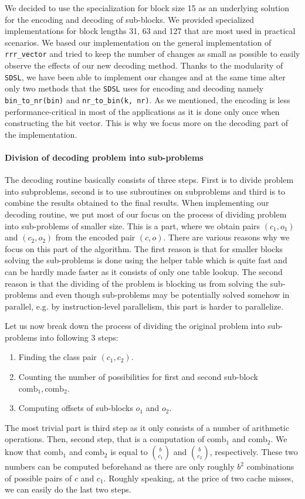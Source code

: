 We decided to use the specialization for block size 15 as an underlying solution for the encoding and
decoding of sub-blocks. We provided specialized implementations for block lengths 31, 63 and 127 that
are most used in practical scenarios. We based our implementation on the general implementation of
\verb'rrr_vector' and tried to keep the number of changes as small as possible to easily observe the
effects of our new decoding method. Thanks to the modularity of \texttt{SDSL}, we have been able to
implement our changes and at the same time alter only two methods that the \texttt{SDSL} uses for
encoding and decoding namely \verb'bin_to_nr(bin)' and \verb'nr_to_bin(k, nr)'. As we mentioned,
the encoding is less performance-critical in most of the applications as it is done only once when
constructing the bit vector. This is why we focus more on the decoding part of the implementation.

\paragraph{Division of decoding problem into sub-problems}

The decoding routine basically consists of three steps. First is to divide problem into subproblems,
second is to use subroutines on subproblems and third is to combine the results obtained to the final
results. When implementing our decoding routine, we put most of our focus on the process of dividing
problem into sub-problems of smaller size. This is a part, where we obtain pairs $(c_1, o_1)$ and $(c_2, o_2)$
from the encoded pair $(c, o)$. There are various reasons why we focus on this part of the algorithm.
The first reason is that for smaller blocks solving the sub-problems is done using the helper table
which is quite fast and can be hardly made faster as it consists of only one table lookup. The second
reason is that the dividing of the problem is blocking us from solving the sub-problems and even though
sub-problems may be potentially solved somehow in parallel, e.g. by instruction-level parallelism, this
part is harder to parallelize.

Let us now break down the process of dividing the original problem into sub-problems into following 3 steps:
\begin{enumerate}
	\item Finding the class pair $(c_1, c_2)$.
	\item Counting the number of possibilities for first and second sub-block $\text{comb}_1, \text{comb}_2$.
	\item Computing offsets of sub-blocks $o_1$ and $o_2$.
\end{enumerate}
The most trivial part is third step as it only consists of a number of arithmetic operations. Then,
second step, that is a computation of $\text{comb}_1$ and $\text{comb}_2$. We know that $\text{comb}_1$
and $\text{comb}_2$ is equal to ${b\choose c_1}$ and ${b\choose c_2}$, respectively. These two numbers
can be computed beforehand as there are only roughly $b^2$ combinations of possible pairs of $c$ and $c_1$.
Roughly speaking, at the price of two cache misses, we can easily do the last two steps.

